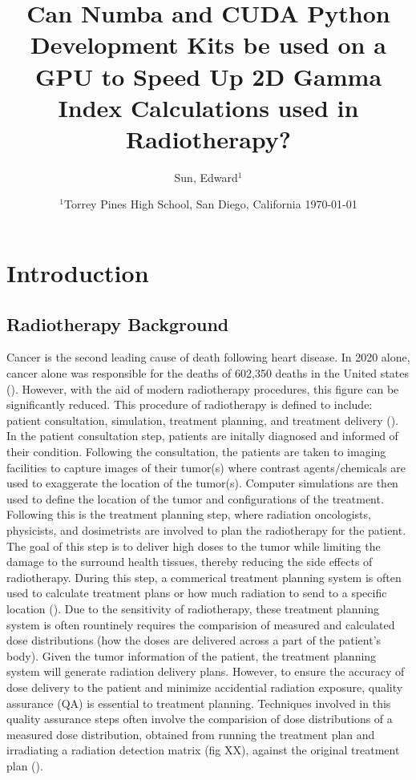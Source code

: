 \documentclass[12pt]{article}
\title{Can Numba and CUDA Python Development Kits be used on a GPU to Speed Up 2D Gamma Index Calculations used in Radiotherapy?}
\author{
  Sun, Edward$^{1}$
}
\date{%
  $^{1}$Torrey Pines High School, San Diego, California
  \today
}
\begin{document}
\maketitle
\section{Introduction}
\subsection{Radiotherapy Background}
Cancer is the second leading cause of death following heart disease. In 2020 alone, cancer alone was responsible for the deaths of 602,350 deaths in the United states (\textcite{CDC}). However, with the aid of modern radiotherapy procedures, this figure can be significantly reduced. This procedure of radiotherapy is defined to include: patient consultation, simulation, treatment planning, and treatment delivery (\textcite{SBU}). In the patient consultation step, patients are initally diagnosed and informed of their condition. Following the consultation, the patients are taken to imaging facilities to capture images of their tumor(s) where contrast agents/chemicals are used to exaggerate the location of the tumor(s). Computer simulations are then used to define the location of the tumor and configurations of the treatment. Following this is the treatment planning step, where radiation oncologists, physicists, and dosimetrists are involved to plan the radiotherapy for the patient. The goal of this step is to deliver high doses to the tumor while limiting the damage to the surround health tissues, thereby reducing the side effects of radiotherapy. During this step, a commerical treatment planning system is often used to calculate treatment plans or how much radiation to send to a specific location (\textcite{Gardner}). Due to the sensitivity of radiotherapy, these treatment planning system is often rountinely requires the comparision of measured and calculated dose distributions (how the doses are delivered across a part of the patient's body). Given the tumor information of the patient, the treatment planning system will generate radiation delivery plans. However, to ensure the accuracy of dose delivery to the patient and minimize accidential radiation exposure, quality assurance (QA) is essential to treatment planning. Techniques involved in this quality assurance steps often involve the comparision of dose distributions of a measured dose distribution, obtained from running the treatment plan and irradiating a radiation detection matrix (fig XX), against the original treatment plan (\textcite{Low}).
\end{document}
